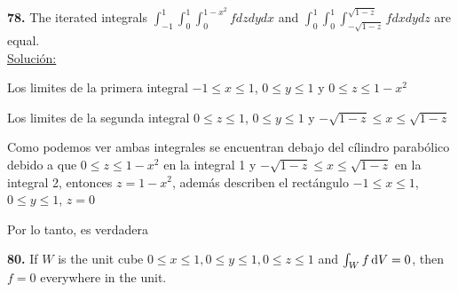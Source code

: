 \documentclass[11pt]{report}
\newcommand{\s}{\underline{Soluci\'{o}n:}}
\begin{document}
\textbf{78.} The iterated integrals $\int_{-1}^1 \int_0^1 \int_0^{1-x^2} f dz dy dx $
and $\int_0^1 \int_0^1 \int_{-\sqrt{1-z}}^{\sqrt{1-z}} f dx dy dz $ are equal. \\

\s

Los limites de la primera integral $-1 \leq x \leq 1$, $0 \leq y \leq 1$ y $0 \leq z \leq 1-x^2$

Los limites de la segunda integral $0 \leq z \leq 1$, $0 \leq y \leq 1$ y
$-\sqrt{1-z} \leq x \leq \sqrt{1-z}$

Como podemos ver ambas integrales se encuentran debajo del c\'{i}lindro parab\'{o}lico
debido a que $0 \leq z \leq 1-x^2$ en la integral 1 y $-\sqrt{1-z} \leq x \leq \sqrt{1-z}$
en la integral 2, entonces $z = 1-x^2$, adem\'{a}s describen el rect\'{a}ngulo
$-1 \leq x \leq 1$, $0 \leq y \leq 1$, $z = 0$

Por lo tanto, es verdadera


\textbf{80.} If $W$ is the unit cube $0 \leq x \leq 1, 0 \leq y \leq 1, 0 \leq z \leq 1$
and $ \int _W f \, \text dV = 0$, then $f = 0$ everywhere in the unit. \\
\end{document}
